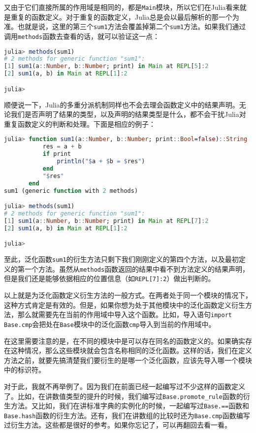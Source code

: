 又由于它们直接所属的作用域是相同的，都是\verb`Main`模块，所以它们在Julia看来就是重复的函数定义。对于重复的函数定义，Julia总是会以最后解析的那一个为准。也就是说，这里的第三个\verb`sum1`方法会覆盖掉第二个\verb`sum1`方法。如果我们通过调用\verb`methods`函数去查看的话，就可以验证这一点：

\begin{lstlisting}[language=julia]
julia> methods(sum1)
# 2 methods for generic function "sum1":
[1] sum1(a::Number, b::Number; print) in Main at REPL[5]:2
[2] sum1(a, b) in Main at REPL[1]:2

julia> 
\end{lstlisting}

顺便说一下，Julia的多重分派机制同样也不会去理会函数定义中的结果声明。无论我们是否声明了结果的类型，以及声明的结果类型是什么，都不会干扰Julia对重复函数定义的判断和处理。下面是相应的例子：

\begin{lstlisting}[language=julia]
julia> function sum1(a::Number, b::Number; print::Bool=false)::String
           res = a + b
           if print
               println("$a + $b = $res")
           end
           "$res"
       end
sum1 (generic function with 2 methods)

julia> methods(sum1)
# 2 methods for generic function "sum1":
[1] sum1(a::Number, b::Number; print) in Main at REPL[7]:2
[2] sum1(a, b) in Main at REPL[1]:2

julia> 
\end{lstlisting}

至此，泛化函数\verb`sum1`的衍生方法只剩下我们刚刚定义的第四个方法，以及最初定义的第一个方法。虽然从\verb`methods`函数返回的结果中看不到方法定义的结果声明，但是我们还是能够依据相应的位置信息（如\verb`REPL[7]:2`）做出判断的。

以上就是为泛化函数定义衍生方法的一般方式。在两者处于同一个模块的情况下，这种方式肯定是有效的。但是，如果你想为处于其他模块中的泛化函数定义衍生方法，那么就需要先在当前的作用域中导入这个函数。比如，导入语句\verb`import Base.cmp`会把处在\verb`Base`模块中的泛化函数\verb`cmp`导入到当前的作用域中。

在这里需要注意的是，在不同的模块中是可以存在同名的函数定义的。如果确实存在这种情况，那么这些模块就会包含名称相同的泛化函数。这样的话，我们在定义方法之前，就要先搞清楚我们要衍生的是哪一个泛化函数，应该先导入哪一个模块中的标识符。

对于此，我就不再举例了。因为我们在前面已经一起编写过不少这样的函数定义了。比如，在讲数值类型的提升的时候，我们编写过\verb`Base.promote_rule`函数的衍生方法。又比如，我们在讲标准字典的实例化的时候，一起编写过\verb`Base.==`函数和\verb`Base.hash`函数的衍生方法。还有，我们在讲数组的比较时还为\verb`Base.cmp`函数编写过衍生方法。这些都是很好的参考。如果你忘记了，可以再翻回去看一看。

